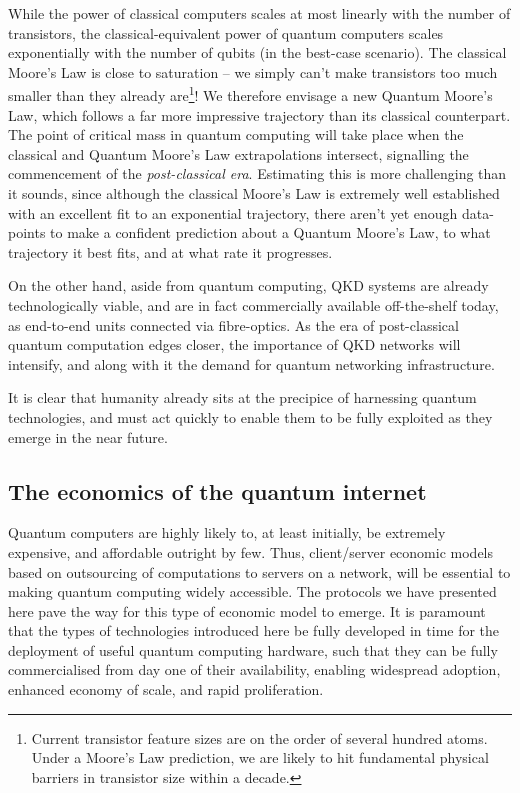 \documentclass[aps,rmp,twocolumn,amsmath,amssymb,nofootinbib,superscriptaddress,longbibliography,floatfix,table-of-contents,eqsecnum]{revtex4-1}
\newcommand{\comment}[1]{{\color{blue}{\textbf{#1}}}}
\begin{document}
While the power of classical computers scales at most linearly with the number of transistors, the classical-equivalent power of quantum computers scales exponentially with the number of qubits (in the best-case scenario). The classical Moore's Law is close to saturation -- we simply can't make transistors too much smaller than they already are\footnote{Current transistor feature sizes are on the order of several hundred atoms. Under a Moore's Law prediction, we are likely to hit fundamental physical barriers in transistor size within a decade.}! We therefore envisage a new Quantum Moore's Law, which follows a far more impressive trajectory than its classical counterpart. The point of critical mass in quantum computing will take place when the classical and Quantum Moore's Law extrapolations intersect, signalling the commencement of the \textit{post-classical era}. Estimating this is more challenging than it sounds, since although the classical Moore's Law is extremely well established with an excellent fit to an exponential trajectory, there aren't yet enough data-points to make a confident prediction about a Quantum Moore's Law, to what trajectory it best fits, and at what rate it progresses.

On the other hand, aside from quantum computing, QKD systems are already technologically viable, and are in fact commercially available off-the-shelf today, as end-to-end units connected via fibre-optics. As the era of post-classical quantum computation edges closer, the importance of QKD networks will intensify, and along with it the demand for quantum networking infrastructure.

It is clear that humanity already sits at the precipice of harnessing quantum technologies, and must act quickly to enable them to be fully exploited as they emerge in the near future.

%
%

\subsection{The economics of the quantum internet} \label{sec:economics} 

\comment{Add discussion of global virtual QC and quantum singularity!}

Quantum computers are highly likely to, at least initially, be extremely expensive, and affordable outright by few. Thus, client/server economic models based on outsourcing of computations to servers on a network, will be essential to making quantum computing widely accessible. The protocols we have presented here pave the way for this type of economic model to emerge. It is paramount that the types of technologies introduced here be fully developed in time for the deployment of useful quantum computing hardware, such that they can be fully commercialised from day one of their availability, enabling widespread adoption, enhanced economy of scale, and rapid proliferation.
\end{document}
